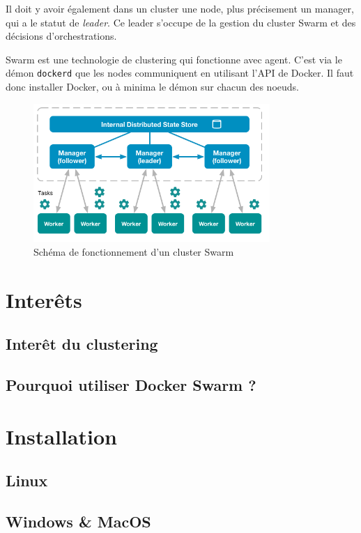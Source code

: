 Il doit y avoir également dans un cluster une node, plus précisement un manager, qui a le statut de
\emph{leader}. Ce leader s'occupe de la gestion du cluster Swarm et des décisions d'orchestrations.

Swarm est une technologie de clustering qui fonctionne avec agent. C'est via le démon
\verb:dockerd: que les nodes communiquent en utilisant l'API de Docker. Il faut donc installer
Docker, ou à minima le démon sur chacun des noeuds.

\begin{figure}[h!]
    \centering
    \includegraphics[width=0.8\textwidth]{img/swarm-network}
    \caption{Schéma de fonctionnement d'un cluster Swarm}
\end{figure}

\chapter{Interêts}

\section{Interêt du clustering}

\section{Pourquoi utiliser Docker Swarm ?}

\chapter{Installation}

\section{Linux}

\section{Windows \& MacOS}

